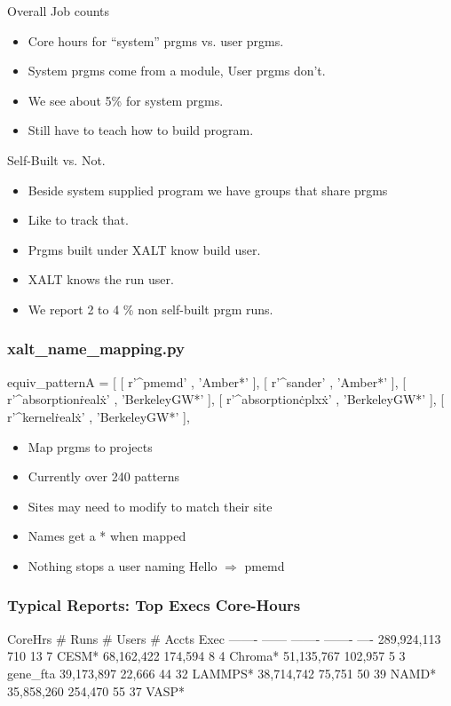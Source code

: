 \documentclass{beamer}
\begin{document}
\begin{frame}{Overall Job counts}
  \begin{itemize}
    \item Core hours for ``system'' prgms vs. user prgms.
    \item System prgms come from a module, User prgms don't.
    \item We see about 5\% for system prgms.
    \item Still have to teach how to build program.
  \end{itemize}
\end{frame}

\begin{frame}{Self-Built vs. Not.}
  \begin{itemize}
    \item Beside system supplied program we have groups that share prgms
    \item Like to track that.
    \item Prgms built under XALT know build user.
    \item XALT knows the run user.
    \item We report 2 to 4 \% non self-built prgm runs.
  \end{itemize}
\end{frame}

\begin{frame}[fragile]
    \frametitle{xalt\_name\_mapping.py}
 {\small
    \begin{semiverbatim}
equiv_patternA = [
    [ r'^pmemd'               , 'Amber*'      ],
    [ r'^sander'              , 'Amber*'      ],
    [ r'^absorption\.real\.x' , 'BerkeleyGW*' ],
    [ r'^absorption\.cplx\.x' , 'BerkeleyGW*' ],
    [ r'^kernel\.real\.x'     , 'BerkeleyGW*' ],
    \end{semiverbatim}
}
  \begin{itemize}
    \item Map prgms to projects 
    \item Currently over 240 patterns
    \item Sites may need to modify to match their site
    \item Names get a \** when mapped
    \item Nothing stops a user naming Hello $\Rightarrow$ pmemd
  \end{itemize}

\end{frame}

\begin{frame}[fragile]
    \frametitle{Typical Reports: Top Execs Core-Hours}
 {\small
    \begin{semiverbatim}
    CoreHrs   # Runs  # Users  # Accts  Exec
    -------   ------  -------  -------  ----
289,924,113      710       13        7  CESM*
 68,162,422  174,594        8        4  Chroma*
 51,135,767  102,957        5        3  gene_fta
 39,173,897   22,666       44       32  LAMMPS*
 38,714,742   75,751       50       39  NAMD*
 35,858,260  254,470       55       37  VASP*
    \end{semiverbatim}
}
\end{frame}
\end{document}
